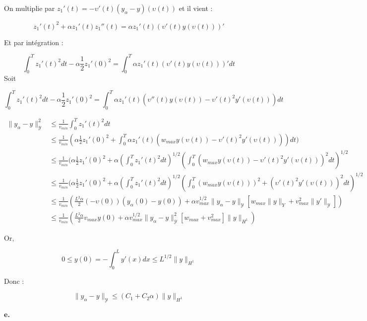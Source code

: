 \documentclass[a4paper]{article}
\newcommand{\Y}{\mathscr{Y}}
\begin{document}
 On multiplie par $z_1'(t) =  - \upsilon'(t)(y_\alpha - y)(\upsilon(t)) $ et il vient :
 
 \[
 z_1'(t)^2 + \alpha z_1'(t)z_1 ''(t) = \alpha z_1'(t)(\upsilon'(t) y(\upsilon(t)))'
 \]

Et par intégration :

\[
\int_0^T z_1'(t)^2dt - \alpha \displaystyle \frac{1}{2} z_1 '(0)^2 
  = \int_0^T \alpha z_1'(t)(\upsilon'(t) y(\upsilon(t)))' dt
\] 
Soit 

\[
\int_0^T z_1'(t)^2dt - \alpha \displaystyle \frac{1}{2} z_1 '(0)^2 
  = \int_0^T \alpha z_1'(t)(\upsilon''(t) y(\upsilon(t)) - \upsilon'(t)^2 y'(\upsilon(t))) dt
\] 

\[
\begin{split}
	\| y_\alpha - y \|_{\Y}^2 
	     & \leq \displaystyle \frac{1}{v_{min}} \int_0^T z_1'(t)^2 dt \\
		 & \leq \displaystyle \frac{1}{v_{min}}
		        ( \alpha \displaystyle \frac{1}{2} z_1 '(0)^2 
				+  \int_0^T \alpha z_1'(t)(w_{max}y(\upsilon(t))
				- \upsilon'(t)^2 y'(\upsilon(t))) )  dt) \\
	   		 & \leq \displaystyle \frac{1}{v_{min}}
	   		        ( \alpha \displaystyle \frac{1}{2} z_1 '(0)^2 
	   				+ \alpha (\int_0^T  z_1'(t)^2 dt )^{1/2}
					(\int_0^T (w_{max}y(\upsilon(t))
	   				- \upsilon'(t)^2 y'(\upsilon(t)))^2  dt)^{1/2} \\
  		 & \leq \displaystyle \frac{1}{v_{min}}
  		        ( \alpha \displaystyle \frac{1}{2} z_1 '(0)^2 
  				+ \alpha (\int_0^T  z_1'(t)^2 dt )^{1/2}
			(\int_0^T (w_{max}y(\upsilon(t)))^2
  				+ (\upsilon'(t)^2 y'(\upsilon(t)))^2  dt)^{1/2} \\
		& \leq \displaystyle \frac{1}{v_{min}}
				( \frac{ L^2\alpha}{2} (-\upsilon(0))(y_\alpha(0) - y(0))
			     + \alpha v_{max}^{1/2}\| y_\alpha - y \|_{\Y}
				  [w_{max} \|y\|_{Y} + v_{max}^2 \| y' \|_{\Y}]  ) \\
		& \leq \displaystyle \frac{1}{v_{min}}
		       ( \frac{ L^2\alpha}{2} v_{max} y(0)
			    + \alpha v_{max}^{1/2}\| y_\alpha - y \|_{\Y}^2
				[w_{max} + v_{max}^2] \|y\|_{H^1}   )
\end{split}
\]		 

Or,

\[ 0 \leq y(0) = -\int_0^L y'(x)dx \leq  L^{1/2} \| y \|_{H^1} \]

Donc :

\[ \| y_\alpha - y \|_{\Y} \leq (C_1 + C_2 \alpha) \| y \|_{H^1} \]

\textbf{e.}
\end{document}

